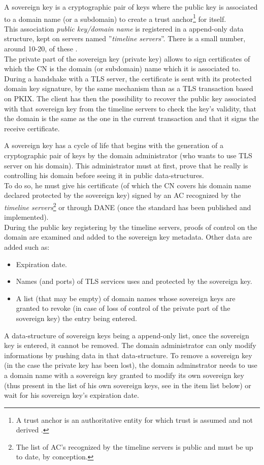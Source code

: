 \documentclass[journal, a4paper]{IEEEtran}
\begin{document}
A sovereign key is a cryptographic pair of keys where the public key is associated to a domain name (or a subdomain) to create a trust anchor\footnote{A trust anchor is an authoritative entity for which trust is assumed and not derived \cite{wallace2010}.} for itself.\\
This association \textit{public key/domain name} is registered in a append-only data structure, kept on servers named ''\textit{timeline servers}''. There is a small number, around 10-20, of these \cite{eck2014}.\\
The private part of the sovereign key (private key) allows to sign certificates of which the CN is the domain (or subdomain) name which it is associated to.\\
During a handshake with a TLS server, the certificate is sent with its protected domain key signature, by the same mechanism than as a TLS transaction based on PKIX. The client has then the possibility to recover the public key associated with that sovereign key from the timeline servers to check the key's validity, that the domain is the same as the one in the current transaction and that it signs the receive certificate.

A sovereign key has a cycle of life that begins with the generation of a cryptographic pair of keys	by the domain administrator (who wants to use TLS server on his domain). This administrator must at first, prove that he really is controlling his domain before seeing it in public data-structures.\\
To do so, he must give his certificate (of which the CN covers his domain name declared protected by the sovereign key) signed by an AC recognized by the \textit{timeline servers}\footnote{The list of AC's recognized by the timeline servers is public and must be up to date, by conception.} or through DANE (once the standard has been published and implemented).\\
During the public key registering by the timeline servers, proofs of control on the domain are examined and added to the sovereign key metadata. Other data are added such as:
\begin{itemize}
	\item Expiration date.
	\item Names (and ports) of TLS services uses and protected by the sovereign key.
	\item A list (that may be empty) of domain names whose sovereign keys are granted to revoke (in case of loss of control of the private part of the sovereign key) the entry being entered.
\end{itemize}
A data-structure of sovereign keys being a append-only list, once the sovereign key is entered, it cannot be removed. The domain administrator can only modify informations by pushing data in that data-structure. To remove a sovereign key (in the case the private key has been lost), the domain adminstrator needs to use a domain name with a sovereign key granted to modify its own sovereign key (thus present in the list of his own sovereign keys, see in the item list below) or wait for his sovereign key's expiration date. 
\end{document}

